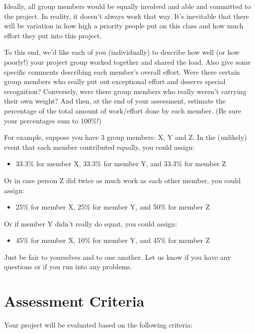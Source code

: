 \documentclass[10pt]{article}
\begin{document}
Ideally, all group members would be equally involved and able and committed to the project.  In reality, it doesn't always work that way.  It's inevitable that there will be variation in how high a priority people put on this class and how much effort they put into this project.  

To this end, we'd like each of you (individually) to describe how well (or how poorly!) your project group worked together and shared the load.  Also give some specific comments describing each member’s overall effort.  Were there certain group members who really put out exceptional effort and deserve special recognition?  Conversely, were there group members who really weren't carrying their own weight?  And then, at the end of your assessment, estimate the percentage of the total amount of work/effort done by each member.  (Be sure your percentages sum to 100\%!)  

For example, suppose you have 3 group members: X, Y and Z.  In the (unlikely) event that each member contributed equally, you could assign:
	\begin{itemize}
		\item 33.3\% for member X,
		33.3\% for member Y, and
		33.3\% for member Z
	\end{itemize}

Or in case person Z did twice as much work as each other member, you could assign:
	\begin{itemize}
		\item 25\% for member X,
		25\% for member Y, and
		50\% for member Z
	\end{itemize}

Or if member Y didn’t really do squat, you could assign:
	\begin{itemize}
		\item 45\% for member X,
		10\% for member Y, and
		45\% for member Z
	\end{itemize}

Just be fair to yourselves and to one another. Let us know if you have any questions or if you run into any problems.


\section{Assessment Criteria}

Your project will be evaluated based on the following criteria:
\end{document}
